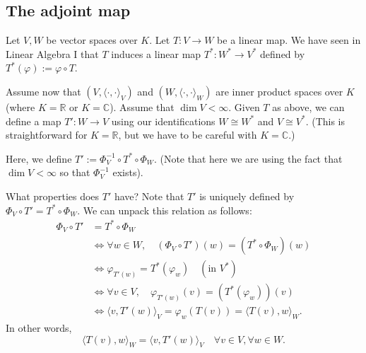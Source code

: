 \subsection*{The adjoint map}

Let $V, W$ be vector spaces over $K$. Let $T \colon V \to W$ be a linear map. We have seen in Linear Algebra I that $T$ induces a linear map $T^* \colon W^* \to V^*$ defined by $T^*(\varphi) := \varphi \circ T$.

\begin{center}
\end{center}

Assume now that $(V, \langle \cdot, \cdot \rangle_V)$ and $(W, \langle \cdot, \cdot \rangle_W)$ are inner product spaces over $K$ (where $K = \mathbb{R}$ or $K = \mathbb{C}$). Assume that $\dim V < \infty$.
Given $T$ as above, we can define a map $T' \colon W \to V$ using our  identifications $W \cong W^*$ and $V \cong V^*$. (This is straightforward for $K = \mathbb{R}$, but we have to be careful with $K = \mathbb{C}$.)

\begin{center}
\end{center}

Here, we define $T' := \Phi_V^{-1} \circ T^* \circ \Phi_W$. (Note that here we are using the fact that $\dim V < \infty$ so that $\Phi_V^{-1}$ exists).

What properties does $T'$ have? Note that $T'$ is uniquely defined by $\Phi_V \circ T' = T^* \circ \Phi_W$. We can unpack this relation as follows:
\begin{align*}
    \Phi_V \circ T' &= T^* \circ \Phi_W \\
    &\iff \forall w \in W, \quad (\Phi_V \circ T')(w) = (T^* \circ \Phi_W)(w) \\
    &\iff \varphi_{T'(w)} = T^*(\varphi_w) \quad (\text{in } V^*) \\
    &\iff \forall v \in V, \quad \varphi_{T'(w)}(v) = (T^*(\varphi_w))(v) \\
    &\iff \langle v, T'(w) \rangle_V = \varphi_w(T(v)) = \langle T(v), w \rangle_W.
\end{align*}
In other words,
\begin{equation}
\label{eq:adjoint_property}
    \langle T(v), w \rangle_W = \langle v, T'(w) \rangle_V \quad \forall v \in V, \forall w \in W.
\end{equation}

